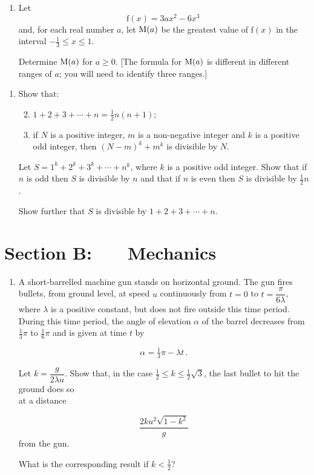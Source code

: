 \documentclass[a4, 11pt]{report}
\newlength{\qspace}
\newcounter{qnumber}
\newenvironment{question}%
 {\vspace{\qspace}
  \begin{enumerate}[\bfseries 1\quad][10]%
    \setcounter{enumi}{\value{qnumber}}%
    \item%
 }
{
  \end{enumerate}
  \filbreak
  \stepcounter{qnumber}
 }
\newenvironment{questionparts}[1][1]%
 {
  \begin{enumerate}[\bfseries (i)]%
    \setcounter{enumii}{#1}
    \addtocounter{enumii}{-1}
    \setlength{\itemsep}{5mm}
    \setlength{\parskip}{8pt}
 }
 {
  \end{enumerate}
 }
\def\f{{\mathrm f}}
\def\le{\leqslant}
\def\ge{\geqslant}
\renewcommand{\.}[1]{\ensuremath{\mathrm{#1}}}
\newcommand{\+}[1]{\ensuremath{\mathbf{#1}}}
\begin{document}
\begin{question}
 Let 
\[
\f(x) = 3ax^2 - 6x^3\,
\]
and, for  each real number $a$, let ${\rm M}(a)$ be the greatest value of $\f(x)$ in the interval $-\frac13 \le x \le 1$.

Determine ${\rm M} (a)$ for $a\ge0$. [The formula for ${\rm M} (a)$ is different in different ranges of $a$; you will need to identify three ranges.]\end{question}
		
\begin{question}
Show that:              
\begin{questionparts}
\item $1+2+3+ \cdots + n = \frac12 n(n+1)$;
\item if  $N$ is a positive integer,  $m$ is a non-negative integer and $k$ is a positive odd integer, then $(N-m)^k +m^k$ is divisible by $N$.

\end{questionparts}

Let  $S = 1^k+2^k+3^k + \cdots + n^k$, where $k$ is a positive  odd integer. Show that if $n$ is odd then $S$ is divisible by $n$ and that if $n$ is even then  $S$ is divisible by $\frac12 n$.

Show further that $S$ is divisible by $1+2+3+\cdots +n$. 
\end{question}	
		

		
	
\newpage
\section*{Section B: \ \ \ Mechanics}


	
\begin{question}
  A short-barrelled machine gun stands on horizontal ground. The gun  fires bullets, from ground level,  at speed $u$  continuously from $t=0$ to $t= \dfrac{\pi}{ 6\lambda}$, where $\lambda$ is a positive constant, but does not fire outside this time period. During this time period, the angle of elevation $\alpha$ of the barrel  decreases from $\frac13\pi$ to $\frac16\pi$ and is given at time $t$ by   

\[
\alpha =\tfrac13 \pi - \lambda t\,.
\] 

Let $k = \dfrac{g}{2\lambda u}$. Show that, in the case $\frac12 \le k \le \frac12 \sqrt3$, the last bullet to hit the ground does so\\[2pt] at a distance 

\[
\frac{ 2 k u^2 \sqrt{1-k^2}}{g}
\] from the gun.

What is the corresponding result if $k<\frac12$?

	\end{question}
	
\end{document}
